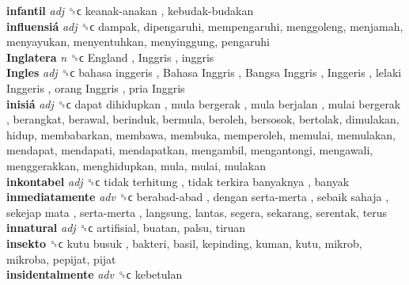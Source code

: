 \textbf{infantil} \emph{adj}  ␝ϲ   keanak-anakan ,  kebudak-budakan   \\
\textbf{influensiá} \emph{adj}  ␝ϲ  dampak, dipengaruhi, mempengaruhi, menggoleng, menjamah, menyayukan, menyentuhkan, menyinggung, pengaruhi  \\
\textbf{Inglatera} \emph{n}  ␝ϲ   England ,  Inggris , inggris  \\
\textbf{Ingles} \emph{adj}  ␝ϲ   bahasa inggeris ,  Bahasa Inggris ,  Bangsa Inggris ,  Inggeris ,  lelaki Inggeris ,  orang Inggris ,  pria Inggris   \\
\textbf{inisiá} \emph{adj}  ␝ϲ   dapat dihidupkan ,  mula bergerak ,  mula berjalan ,  mulai bergerak , berangkat, berawal, berinduk, bermula, beroleh, bersosok, bertolak, dimulakan, hidup, membabarkan, membawa, membuka, memperoleh, memulai, memulakan, mendapat, mendapati, mendapatkan, mengambil, mengantongi, mengawali, menggerakkan, menghidupkan, mula, mulai, mulakan  \\
\textbf{inkontabel} \emph{adj}  ␝ϲ   tidak terhitung ,  tidak terkira banyaknya , banyak  \\
\textbf{inmediatamente} \emph{adv}  ␝ϲ   berabad-abad ,  dengan serta-merta ,  sebaik sahaja ,  sekejap mata ,  serta-merta , langsung, lantas, segera, sekarang, serentak, terus  \\
\textbf{innatural} \emph{adj}  ␝ϲ  artifisial, buatan, palsu, tiruan  \\
\textbf{insekto} ␝ϲ   kutu busuk , bakteri, basil, kepinding, kuman, kutu, mikrob, mikroba, pepijat, pijat  \\
\textbf{insidentalmente} \emph{adv}  ␝ϲ  kebetulan  \\
